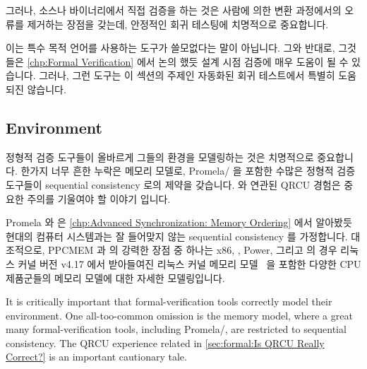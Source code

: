 그러나, 소스나 바이너리에서 직접 검증을 하는 것은 사람에 의한 변환 과정에서의
오류를 제거하는 장점을 갖는데, 안정적인 회귀 테스팅에 치명적으로 중요합니다.

이는 특수 목적 언어를 사용하는 도구가 쓸모없다는 말이 아닙니다.
그와 반대로, 그것들은
\cref{chp:Formal Verification} 에서 논의 했듯 설계 시점 검증에 매우 도움이 될
수 있습니다.
그러나, 그런 도구는 이 섹션의 주제인 자동화된 회귀 테스트에서 특별히 도움되진
않습니다.

\iffalse

However, verifying directly from either the source or binary both have the
advantage of eliminating human translation errors, which is critically
important for reliable regression testing.

This is not to say that tools with special-purpose languages are useless.
On the contrary, they can be quite helpful for design-time verification,
as was discussed in
\cref{chp:Formal Verification}.
However, such tools are not particularly helpful for automated regression
testing, which is in fact the topic of this section.

\fi

\subsection{Environment}
\label{sec:future:Environment}

정형적 검증 도구들이 올바르게 그들의 환경을 모델링하는 것은 치명적으로
중요합니다.
한가지 너무 흔한 누락은 메모리 모델로, Promela/ 을 포함한 수많은
정형적 검증 도구들이 sequential consistency 로의 제약을 갖습니다.
 와 연관된 QRCU 경험은 중요한 주의를
기울여야 할 이야기 입니다.

Promela 와  은
\cref{chp:Advanced Synchronization: Memory Ordering} 에서 알아봤듯 현대의
컴퓨터 시스템과는 잘 들어맞지 않는 sequential consistency 를 가정합니다.
대조적으로, PPCMEM 과  의 강력한 장점 중 하나는 x86, \ARM, Power,
그리고  의 경우 리눅스 커널 버전 v4.17 에서 받아들여진 리눅스 커널
메모리 모델~\cite{Alglave:2018:FSC:3173162.3177156} 을 포함한 다양한 CPU
제품군들의 메모리 모델에 대한 자세한 모델링입니다.

\iffalse

It is critically important that formal-verification tools correctly
model their environment.
One all-too-common omission is the memory model, where a great
many formal-verification tools, including Promela/, are
restricted to sequential consistency.
The QRCU experience related in
\cref{sec:formal:Is QRCU Really Correct?}
is an important cautionary tale.

